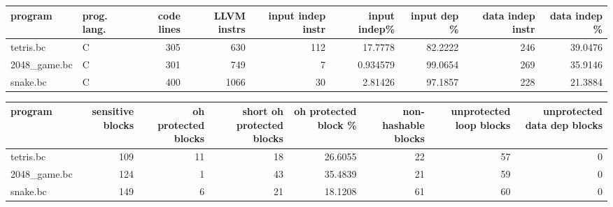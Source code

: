 \documentclass{article}
\begin{document}
\begin{table}[ht]
\centering
\begin{adjustbox}{width=1.3\textwidth}
\begin{tabular}{llrrrrrrr}
\hline
 program      & prog. lang.   &   code lines &   LLVM instrs &   input indep instr &   input indep\% &   input dep \% &   data indep instr &   data indep \% \\
\hline
 tetris.bc    & C             &          305 &           630 &                 112 &      17.7778   &       82.2222 &                246 &        39.0476 \\
 2048\_game.bc & C             &          301 &           749 &                   7 &       0.934579 &       99.0654 &                269 &        35.9146 \\
 snake.bc     & C             &          400 &          1066 &                  30 &       2.81426  &       97.1857 &                228 &        21.3884 \\
\hline
\end{tabular}

\end{adjustbox}
\end{table}

\begin{table}[ht]
\centering
\begin{adjustbox}{width=1.3\textwidth}
\begin{tabular}{lrrrrrrr}
\hline
 program      &   sensitive blocks &   oh protected blocks &   short oh protected blocks &   oh protected block \% &   non-hashable blocks &   unprotected loop blocks &   unprotected data dep blocks \\
\hline
 tetris.bc    &                109 &                    11 &                          18 &                26.6055 &                    22 &                        57 &                             0 \\
 2048\_game.bc &                124 &                     1 &                          43 &                35.4839 &                    21 &                        59 &                             0 \\
 snake.bc     &                149 &                     6 &                          21 &                18.1208 &                    61 &                        60 &                             0 \\
\hline
\end{tabular}

\end{adjustbox}
\end{table}
\end{document}
